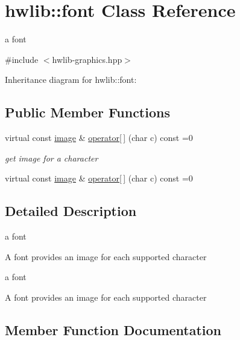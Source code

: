 \hypertarget{classhwlib_1_1font}{}\section{hwlib\+:\+:font Class Reference}
\label{classhwlib_1_1font}


a font  




{\ttfamily \#include $<$hwlib-\/graphics.\+hpp$>$}



Inheritance diagram for hwlib\+:\+:font\+:
\subsection*{Public Member Functions}
\begin{DoxyCompactItemize}
\item 
virtual const \hyperlink{classhwlib_1_1image}{image} \& \hyperlink{classhwlib_1_1font_a723595f70f1e042db23d3140b1d4cad8}{operator\mbox{[}$\,$\mbox{]}} (char c) const =0
\begin{DoxyCompactList}\small\item\em get image for a character \end{DoxyCompactList}\item 
virtual const \hyperlink{classhwlib_1_1image}{image} \& \hyperlink{classhwlib_1_1font_a723595f70f1e042db23d3140b1d4cad8}{operator\mbox{[}$\,$\mbox{]}} (char c) const =0
\end{DoxyCompactItemize}


\subsection{Detailed Description}
a font 

A font provides an image for each supported character

a font

A font provides an image for each supported character 

\subsection{Member Function Documentation}
\mbox{\label{classhwlib_1_1font_a723595f70f1e042db23d3140b1d4cad8}} 
